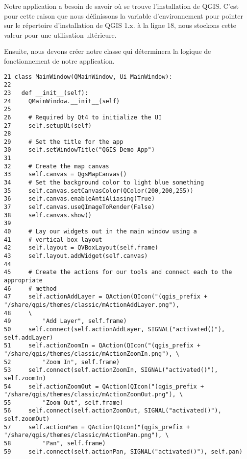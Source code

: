 Notre application a besoin de savoir o\`u se trouve l'installation de QGIS. C'est pour cette raison que nous d\'efinissons la variable d'environnement  pour pointer sur le r\'epertoire d'installation de QGIS 1.x. \`a la ligne 18, nous stockons cette valeur pour une utilisation ult\'erieure.

Ensuite, nous devons cr\'eer notre classe  qui d\'eterminera la logique de fonctionnement de notre application.
\begin{verbatim}
21 class MainWindow(QMainWindow, Ui_MainWindow):
22 
23   def __init__(self):
24     QMainWindow.__init__(self)
25 
26     # Required by Qt4 to initialize the UI
27     self.setupUi(self)
28 
29     # Set the title for the app
30     self.setWindowTitle("QGIS Demo App")
31 
32     # Create the map canvas
33     self.canvas = QgsMapCanvas()
34     # Set the background color to light blue something
35     self.canvas.setCanvasColor(QColor(200,200,255))
36     self.canvas.enableAntiAliasing(True)
37     self.canvas.useQImageToRender(False)
38     self.canvas.show()
39 
40     # Lay our widgets out in the main window using a 
41     # vertical box layout
42     self.layout = QVBoxLayout(self.frame)
43     self.layout.addWidget(self.canvas)
44 
45     # Create the actions for our tools and connect each to the appropriate
46     # method
47     self.actionAddLayer = QAction(QIcon("(qgis_prefix + "/share/qgis/themes/classic/mActionAddLayer.png"),
48     \
49         "Add Layer", self.frame)
50     self.connect(self.actionAddLayer, SIGNAL("activated()"), self.addLayer)
51     self.actionZoomIn = QAction(QIcon("(qgis_prefix + "/share/qgis/themes/classic/mActionZoomIn.png"), \
52         "Zoom In", self.frame)
53     self.connect(self.actionZoomIn, SIGNAL("activated()"), self.zoomIn)
54     self.actionZoomOut = QAction(QIcon("(qgis_prefix + "/share/qgis/themes/classic/mActionZoomOut.png"), \
55         "Zoom Out", self.frame)
56     self.connect(self.actionZoomOut, SIGNAL("activated()"), self.zoomOut)
57     self.actionPan = QAction(QIcon("(qgis_prefix + "/share/qgis/themes/classic/mActionPan.png"), \
58         "Pan", self.frame)
59     self.connect(self.actionPan, SIGNAL("activated()"), self.pan)

\end{verbatim}
